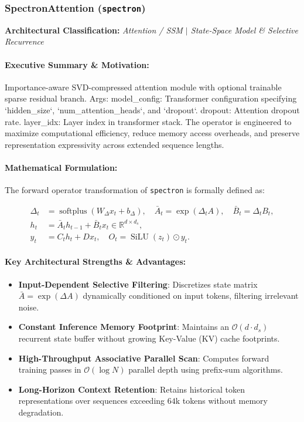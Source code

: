 \subsubsection{SpectronAttention (\texttt{spectron})}
\label{sec:module_spectron}

\textbf{Architectural Classification:} \textit{Attention / SSM $\mid$ State-Space Model & Selective Recurrence}

\paragraph{Executive Summary \& Motivation:}
Importance-aware SVD-compressed attention module with optional trainable sparse residual branch.  Args:     model\_config: Transformer configuration specifying `hidden\_size`, `num\_attention\_heads`, and `dropout`.     dropout: Attention dropout rate.     layer\_idx: Layer index in transformer stack. The operator is engineered to maximize computational efficiency, reduce memory access overheads, and preserve representation expressivity across extended sequence lengths.

\paragraph{Mathematical Formulation:}
The forward operator transformation of \texttt{spectron} is formally defined as:

\begin{align}
\Delta_t &= \operatorname{softplus}(W_\Delta x_t + b_\Delta), \quad \bar{A}_t = \exp(\Delta_t A), \quad \bar{B}_t = \Delta_t B_t, \\
h_t &= \bar{A}_t h_{t-1} + \bar{B}_t x_t \in \mathbb{R}^{d \times d_s}, \\
y_t &= C_t h_t + D x_t, \quad O_t = \operatorname{SiLU}(z_t) \odot y_t.
\end{align}


\paragraph{Key Architectural Strengths \& Advantages:}
\begin{itemize}
    \item \textbf{Input-Dependent Selective Filtering}: Discretizes state matrix $\bar{A} = \exp(\Delta A)$ dynamically conditioned on input tokens, filtering irrelevant noise.
    \item \textbf{Constant Inference Memory Footprint}: Maintains an $\mathcal{O}(d \cdot d_s)$ recurrent state buffer without growing Key-Value (KV) cache footprints.
    \item \textbf{High-Throughput Associative Parallel Scan}: Computes forward training passes in $\mathcal{O}(\log N)$ parallel depth using prefix-sum algorithms.
    \item \textbf{Long-Horizon Context Retention}: Retains historical token representations over sequences exceeding $64\text{k}$ tokens without memory degradation.
\end{itemize}

